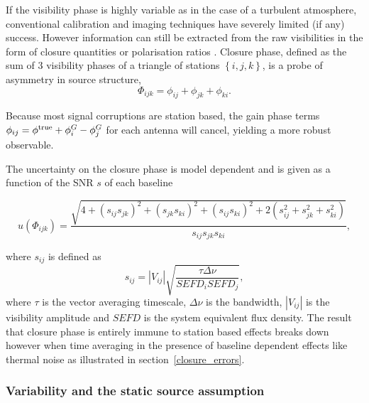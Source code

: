 If the visibility phase is highly variable as in the case of a turbulent atmosphere,  conventional calibration and imaging techniques have severely limited (if any) success. However information can still be extracted from the raw visibilities in the form of closure quantities \citep{Monnier_2007} or polarisation ratios \citep{Fish_2009}. Closure phase, defined as the sum of 3 visibility phases of a triangle of stations $\left\{i,j,k\right\}$, is a probe of asymmetry in source structure,
\begin{equation}
\Phi_{ijk} = \phi_{ij}+\phi_{jk}+\phi_{ki}.
\end{equation}

\noindent Because most signal corruptions are station based, the gain phase terms $\phi_{ij}=\phi^{\rm true}+ \phi^G_i -\phi^G_j$ for each antenna will cancel, yielding a more robust observable. 

The uncertainty on the closure phase is model dependent \citep{Rogers_1995} and is given as a function of the SNR $s$ of each baseline 

\begin{equation}\label{eq:ucp}
u(\Phi_{ijk}) = \frac{\sqrt{4 + (s_{ij}s_{jk})^2 + (s_{jk}s_{ki})^2 + (s_{ij}s_{ki})^2 +
                        2(s_{ij}^2+s_{jk}^2+s_{ki}^2)}}{s_{ij}s_{jk}s_{ki}},
\end{equation}

\noindent where $s_{ij}$ is defined as
\begin{equation}
s_{ij}=|V_{ij}| \sqrt{\frac{ \tau \Delta \nu}{SEFD_i SEFD_j}},
\end{equation}
where $\tau$ is the vector averaging timescale, $\Delta \nu$ is the bandwidth, $|V_{ij}|$ is the visibility amplitude and $SEFD$ is the system equivalent flux density. The result that closure phase is entirely immune to station based effects breaks down however when time averaging in the presence of baseline dependent effects like thermal noise as illustrated in section~\ref{closure_errors}.
 
 \subsubsection{Variability and the static source assumption}

